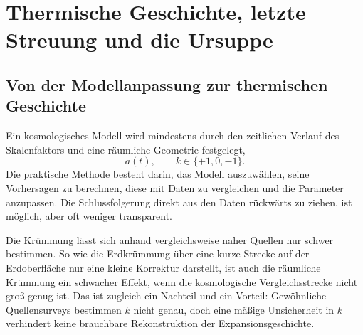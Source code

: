 \chapter{Thermische Geschichte, letzte Streuung und die Ursuppe}


\section{Von der Modellanpassung zur thermischen Geschichte}

Ein kosmologisches Modell wird mindestens durch den zeitlichen Verlauf des Skalenfaktors und eine räumliche Geometrie festgelegt,
\begin{equation}
a(t),
\qquad
k\in\{+1,0,-1\}.
\end{equation}
Die praktische Methode besteht darin, das Modell auszuwählen, seine Vorhersagen zu berechnen, diese mit Daten zu vergleichen und die Parameter anzupassen. Die Schlussfolgerung direkt aus den Daten rückwärts zu ziehen, ist möglich, aber oft weniger transparent.

Die Krümmung lässt sich anhand vergleichsweise naher Quellen nur schwer bestimmen. So wie die Erdkrümmung über eine kurze Strecke auf der Erdoberfläche nur eine kleine Korrektur darstellt, ist auch die räumliche Krümmung ein schwacher Effekt, wenn die kosmologische Vergleichsstrecke nicht groß genug ist. Das ist zugleich ein Nachteil und ein Vorteil: Gewöhnliche Quellensurveys bestimmen \(k\) nicht genau, doch eine mäßige Unsicherheit in \(k\) verhindert keine brauchbare Rekonstruktion der Expansionsgeschichte.

